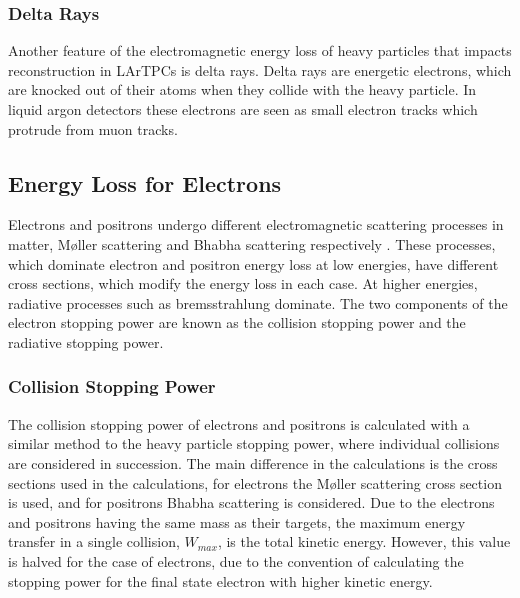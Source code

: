 \subsubsection*{Delta Rays}
Another feature of the electromagnetic energy loss of heavy particles that
impacts reconstruction in LArTPCs is delta rays. Delta rays are energetic
electrons, which are knocked out of their atoms when they collide with the heavy
particle. In liquid argon detectors these electrons are seen as small electron 
tracks which protrude from muon tracks. 

\subsection{Energy Loss for Electrons}
Electrons and positrons undergo different electromagnetic scattering processes
in matter, M{\o}ller scattering and Bhabha scattering respectively 
. These processes, which dominate electron and positron energy loss 
at low energies, have different cross sections, which modify the energy loss in 
each case. At higher energies, radiative processes such as bremsstrahlung 
dominate. The two components of the electron stopping power are known as the 
collision stopping power and the radiative stopping power.

\subsubsection*{Collision Stopping Power}
The collision stopping power of electrons and positrons is calculated with a
similar method to the heavy particle stopping power, where individual collisions
are considered in succession. The main difference in the calculations is the
cross sections used in the calculations, for electrons the M{\o}ller scattering
cross section is used, and for positrons Bhabha scattering is considered. Due to
the electrons and positrons having the same mass as their targets, the maximum 
energy transfer in a single collision, $W_{max}$, is the total kinetic energy. 
However, this value is halved for the case of electrons, due to the convention 
of calculating the stopping power for the final state electron with higher 
kinetic energy.


